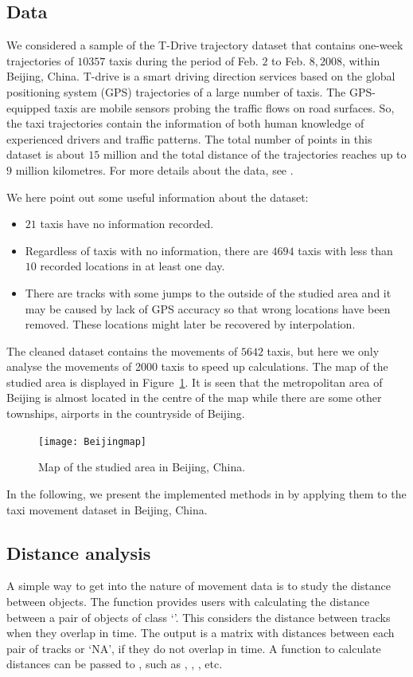 \documentclass[article]{jss}
\newcommand{\class}[1]{`\code{#1}'}
\begin{document}
\subsection{Data}
 We considered a sample of the T-Drive trajectory dataset that contains one-week trajectories of $10357$ taxis during the period of Feb. $2$ to Feb. $8, 2008$, within Beijing, China. T-drive is a smart driving direction services based on the global positioning system (GPS) trajectories of a large number of taxis. The GPS-equipped taxis are mobile sensors probing the traffic flows on road surfaces. So, the taxi trajectories contain the information of both human knowledge of experienced drivers and traffic patterns. The total number of points in this dataset is about $15$ million and the total distance of the trajectories reaches up to $9$ million kilometres. For more details about the data, see \cite{yuan10,yuan11}. 
  
We here point out some useful information about the dataset:
\begin{itemize}
  \item $21$ taxis have no information recorded.
  \item Regardless of taxis with no information, there are $4694$ taxis with less than $10$ recorded locations in at least one day. 
  \item There are tracks with some jumps to the outside of the studied area and it may be caused by lack of GPS accuracy so that wrong locations have been removed. These locations might later be recovered by interpolation.
\end{itemize}

The cleaned dataset contains the movements of $5642$ taxis, but here we only analyse the movements of 2000 taxis to speed up calculations. The map of the studied area is displayed in Figure~\ref{Beijingmapgoogle}. It is seen that the metropolitan area of Beijing is almost located in the centre of the map while there are some other townships, airports in the countryside of Beijing.
  \begin{figure}[!h]
  \centering
  \texttt{[image: Beijingmap]}
  \caption{Map of the studied area in Beijing, China.}
  \label{Beijingmapgoogle}
  \end{figure}
  
  In the following, we present the implemented methods in  by applying them to the taxi movement dataset in Beijing, China. 
\subsection{Distance analysis}\label{distanal}
  A simple way to get into the nature of movement data is to study the distance between objects. The function  provides users with calculating the distance between a pair of objects of class \class{Tracks}. This considers the distance between tracks when they overlap in time. The output is a matrix with distances between each pair of tracks or `NA', if they do not overlap in time. A function to calculate distances can be passed to , such as , , , etc.
\end{document}
